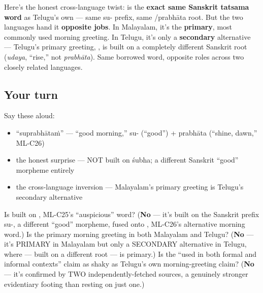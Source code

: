 \begin{culture}
Here's the honest cross-language twist: \textbf{} is the \textbf{exact same Sanskrit tatsama word} as Telugu's own \textbf{} — same su- prefix, same /prabhāta root. But the two languages hand it \textbf{opposite jobs}. In Malayalam, it's the \textbf{primary}, most commonly used morning greeting. In Telugu, it's only a \textbf{secondary} alternative — Telugu's primary greeting, \textbf{}, is built on a completely different Sanskrit root (\emph{udaya}, \textquotedblleft{}rise,\textquotedblright{} not \emph{prabhāta}). Same borrowed word, opposite roles across two closely related languages.
\end{culture}

\subsection*{Your turn}
Say these aloud:

\begin{itemize}
\raggedright
  \item \textquotedblleft{}suprabhātaṁ\textquotedblright{} — \textquotedblleft{}good morning,\textquotedblright{} su- (\textquotedblleft{}good\textquotedblright{}) + prabhāta (\textquotedblleft{}shine, dawn,\textquotedblright{} ML-C26)
  \item the honest surprise — NOT built on śubha; a different Sanskrit \textquotedblleft{}good\textquotedblright{} morpheme entirely
  \item the cross-language inversion — Malayalam's primary greeting is Telugu's secondary alternative
\end{itemize}

\begin{tcolorbox}[breakable,colback=teal!4,colframe=teal!35!black,title={Before you move on}]
Is  built on , ML-C25's \textquotedblleft{}auspicious\textquotedblright{} word? (\textbf{No} — it's built on the Sanskrit prefix su-, a different \textquotedblleft{}good\textquotedblright{} morpheme, fused onto , ML-C26's alternative morning word.) Is  the primary morning greeting in both Malayalam and Telugu? (\textbf{No} — it's PRIMARY in Malayalam but only a SECONDARY alternative in Telugu, where  — built on a different root — is primary.) Is the \textquotedblleft{}used in both formal and informal contexts\textquotedblright{} claim as shaky as Telugu's own morning-greeting claim? (\textbf{No} — it's confirmed by TWO independently-fetched sources, a genuinely stronger evidentiary footing than resting on just one.)
\end{tcolorbox}
